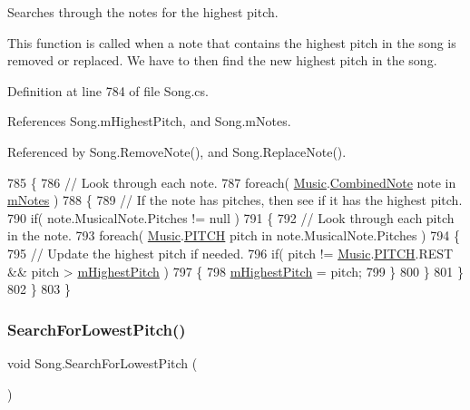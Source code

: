 Searches through the notes for the highest pitch. 

This function is called when a note that contains the highest pitch in the song is removed or replaced. We have to then find the new highest pitch in the song. 

Definition at line 784 of file Song.\+cs.



References Song.\+m\+Highest\+Pitch, and Song.\+m\+Notes.



Referenced by Song.\+Remove\+Note(), and Song.\+Replace\+Note().


\begin{DoxyCode}
785     \{
786         \textcolor{comment}{// Look through each note.}
787         \textcolor{keywordflow}{foreach}( \hyperlink{class_music}{Music}.\hyperlink{group___music_structs_struct_music_1_1_combined_note}{CombinedNote} note in \hyperlink{group___song_priv_var_ga674bc904a1f856d485d5fb7fe84bac85}{mNotes} )
788         \{
789             \textcolor{comment}{// If the note has pitches, then see if it has the highest pitch.}
790             \textcolor{keywordflow}{if}( note.MusicalNote.Pitches != null )
791             \{
792                 \textcolor{comment}{// Look through each pitch in the note.}
793                 \textcolor{keywordflow}{foreach}( \hyperlink{class_music}{Music}.\hyperlink{group___music_enums_ga508f69b199ea518f935486c990edac1d}{PITCH} pitch in note.MusicalNote.Pitches )
794                 \{
795                     \textcolor{comment}{// Update the highest pitch if needed.}
796                     \textcolor{keywordflow}{if}( pitch != \hyperlink{class_music}{Music}.\hyperlink{group___music_enums_ga508f69b199ea518f935486c990edac1d}{PITCH}.REST && pitch > 
      \hyperlink{group___song_priv_var_ga2dcd39d9add609e9df56a94057441dcc}{mHighestPitch} )
797                     \{
798                         \hyperlink{group___song_priv_var_ga2dcd39d9add609e9df56a94057441dcc}{mHighestPitch} = pitch;
799                     \}
800                 \}
801             \}
802         \}
803     \}
\end{DoxyCode}
\mbox{\label{group___song_priv_func_gac2e812c6385529eb7a9be5082c7bde75}} 
\subsubsection{\texorpdfstring{Search\+For\+Lowest\+Pitch()}{SearchForLowestPitch()}}
{\footnotesize\ttfamily void Song.\+Search\+For\+Lowest\+Pitch (\begin{DoxyParamCaption}{ }\end{DoxyParamCaption})\hspace{0.3cm}{\ttfamily [private]}}



